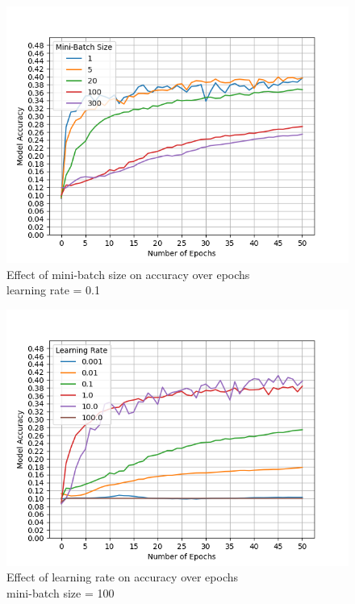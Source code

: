 \begin{figure}[h!]
    \centering
    \includegraphics[width=\textwidth]{figures/mbs_cmp.png}
    \caption{
        Effect of mini-batch size on accuracy over epochs \\
        learning rate = 0.1
    }\label{Figure_1}
\end{figure}

\begin{figure}[h!]
    \centering
    \includegraphics[width=\textwidth]{figures/lr_cmp.png}
    \caption{
        Effect of learning rate on accuracy over epochs \\
        mini-batch size = 100
    }\label{Figure_2}
\end{figure}

